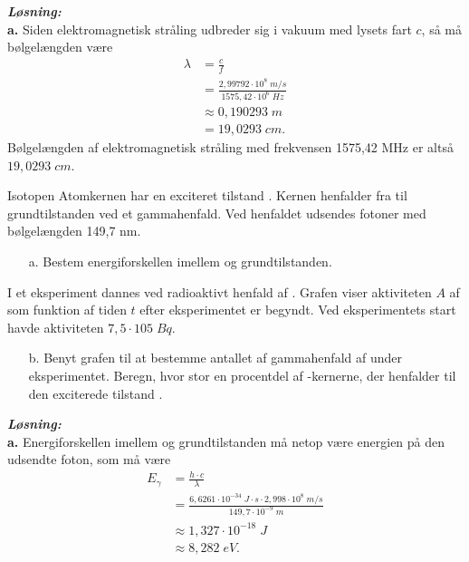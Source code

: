 \documentclass{report}
\newcommand{\sol}{\setlength{\parindent}{0cm}\textbf{\textit{Løsning:}}\setlength{\parindent}{1cm}}
\begin{document}
\sol \\
\textbf{a.}
Siden elektromagnetisk stråling udbreder sig i vakuum med lysets fart $c$, så må bølgelængden være
\begin{equation*}
\begin{split}
  \lambda &=\frac{c}{f}\\
  &=\frac{2,99792 \cdot 10 ^{8} \;\unit{m/s} }{1575,42 \cdot 10^6 \;\unit{Hz}}\\
  &\approx 0,190293 \;\unit{m} \\
  &=19,0293 \;\unit{cm}.
\end{split}
\end{equation*}
Bølgelængden af elektromagnetisk stråling med frekvensen 1575,42 MHz er altså $19,0293 \;\unit{cm} $.

\begin{question}{Isotopen }{}
Atomkernen  har en exciteret tilstand . 
Kernen henfalder fra  til grundtilstanden ved et gammahenfald. Ved henfaldet udsendes fotoner med bølgelængden 149,7 nm.
\begin{itemize}
  \item[a.] Bestem energiforskellen imellem  og grundtilstanden.
\end{itemize}
I et eksperiment dannes  ved radioaktivt henfald af .
Grafen viser aktiviteten $A$ af  som funktion af tiden $t$ efter eksperimentet er begyndt.
Ved eksperimentets start havde  aktiviteten $7,5 \cdot 105 \;\unit{Bq}$.
\begin{itemize}
  \item[b.] Benyt grafen til at bestemme antallet af gammahenfald af  under eksperimentet.
  Beregn, hvor stor en procentdel af -kernerne, der henfalder til den exciterede tilstand .
\end{itemize}
\end{question}
\sol \\
\textbf{a.}
Energiforskellen imellem  og grundtilstanden må netop være energien på den udsendte foton, som må være
\begin{equation*}
\begin{split}
  E _{\gamma }&=\frac{h \cdot c}{\lambda }\\
  &=\frac{6,6261 \cdot 10 ^{-34} \;\unit{J \cdot s} \cdot 2,998 \cdot 10^8 \;\unit{m/s} }{149,7 \cdot 10 ^{-9}\;\unit{m} }\\
  &\approx 1,327 \cdot 10 ^{-18} \;\unit{J}\\
  &\approx 8,282 \;\unit{eV}.
\end{split}
\end{equation*}
\end{document}
